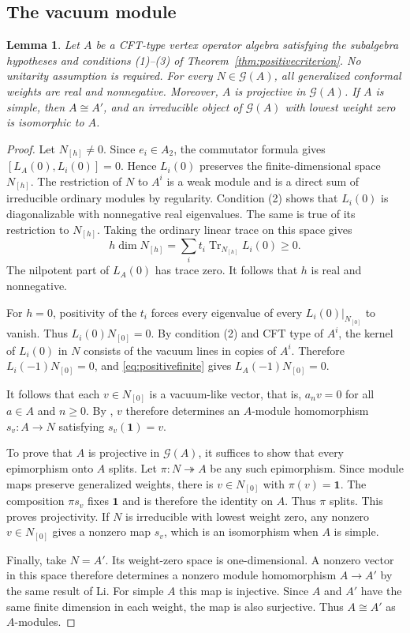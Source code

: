 \documentclass[11pt,reqno]{amsart}
\newtheorem{lemma}[theorem]{Lemma}
\theoremstyle{definition}\newtheorem{definition}[theorem]{Definition}
\theoremstyle{remark}\newtheorem{remark}[theorem]{Remark}
\newcommand{\one}{\mathbf1}\newcommand{\slc}{\mathfrak{sl}_2}
\numberwithin{equation}{section}
\begin{document}
\subsection{The vacuum module}
\begin{lemma}\label{lem:vacuumprojective}
Let $A$ be a CFT-type vertex operator algebra satisfying the subalgebra hypotheses and conditions (1)--(3) of Theorem~\ref{thm:positivecriterion}. No unitarity assumption is required. For every $N\in\mathcal G(A)$, all generalized conformal weights are real and nonnegative. Moreover, $A$ is projective in $\mathcal G(A)$. If $A$ is simple, then $A\cong A'$, and an irreducible object of $\mathcal G(A)$ with lowest weight zero is isomorphic to $A$.
\end{lemma}
\begin{proof}
Let $N_{[h]}\ne0$. Since $e_i\in A_2$, the commutator formula gives $[L_A(0),L_i(0)]=0$. Hence $L_i(0)$ preserves the finite-dimensional space $N_{[h]}$. The restriction of $N$ to $A^i$ is a weak module and is a direct sum of irreducible ordinary modules by regularity. Condition (2) shows that $L_i(0)$ is diagonalizable with nonnegative real eigenvalues. The same is true of its restriction to $N_{[h]}$. Taking the ordinary linear trace on this space gives
\begin{equation}\label{eq:tracepositivity}
 h\dim N_{[h]}=\sum_i t_i\operatorname{Tr}_{N_{[h]}}L_i(0)\ge0.
\end{equation}
The nilpotent part of $L_A(0)$ has trace zero. It follows that $h$ is real and nonnegative.

For $h=0$, positivity of the $t_i$ forces every eigenvalue of every $L_i(0)|_{N_{[0]}}$ to vanish. Thus $L_i(0)N_{[0]}=0$. By condition (2) and CFT type of $A^i$, the kernel of $L_i(0)$ in $N$ consists of the vacuum lines in copies of $A^i$. Therefore $L_i(-1)N_{[0]}=0$, and \eqref{eq:positivefinite} gives $L_A(-1)N_{[0]}=0$.

It follows that each $v\in N_{[0]}$ is a vacuum-like vector, that is, $a_nv=0$ for all $a\in A$ and $n\ge0$. By \cite[Propositions 3.3--3.4]{LiForms}, $v$ therefore determines an $A$-module homomorphism $s_v:A\to N$ satisfying $s_v(\one)=v$.

To prove that $A$ is projective in $\mathcal G(A)$, it suffices to show that every epimorphism onto $A$ splits. Let $\pi:N\twoheadrightarrow A$ be any such epimorphism. Since module maps preserve generalized weights, there is $v\in N_{[0]}$ with $\pi(v)=\one$. The composition $\pi s_v$ fixes $\one$ and is therefore the identity on $A$. Thus $\pi$ splits. This proves projectivity. If $N$ is irreducible with lowest weight zero, any nonzero $v\in N_{[0]}$ gives a nonzero map $s_v$, which is an isomorphism when $A$ is simple.

Finally, take $N=A'$. Its weight-zero space is one-dimensional. A nonzero vector in this space therefore determines a nonzero module homomorphism $A\to A'$ by the same result of Li. For simple $A$ this map is injective. Since $A$ and $A'$ have the same finite dimension in each weight, the map is also surjective. Thus $A\cong A'$ as $A$-modules.
\end{proof}
\end{document}
